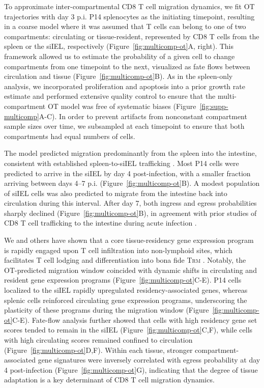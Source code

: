To approximate inter-compartmental CD8 T cell migration dynamics, we fit OT trajectories with day 3 p.i. P14 splenocytes as the initiating timepoint, resulting in a coarse model where it was assumed that T cells can belong to one of two compartments: circulating or tissue-resident, represented by CD8 T cells from the spleen or the siIEL, respectively (Figure~\ref{fig:multicomp-ot}A, right). This framework allowed us to estimate the probability of a given cell to change compartments from one timepoint to the next, visualized as fate flows between circulation and tissue (Figure~\ref{fig:multicomp-ot}B). As in the spleen-only analysis, we incorporated proliferation and apoptosis into a prior growth rate estimate and performed extensive quality control to ensure that the multi-compartment OT model was free of systematic biases (Figure~\ref{fig:supp-multicomp}A-C). In order to prevent artifacts from nonconstant compartment sample sizes over time, we subsampled at each timepoint to ensure that both compartments had equal numbers of cells.

The model predicted migration predominantly from the spleen into the intestine, consistent with established spleen-to-siIEL trafficking \citep{masopustDynamicCellMigration2010}. Most P14 cells were predicted to arrive in the siIEL by day 4 post-infection, with a smaller fraction arriving between days 4--7 p.i. (Figure~\ref{fig:multicomp-ot}B). A modest population of siIEL cells was also predicted to migrate from the intestine back into circulation during this interval. After day 7, both ingress and egress probabilities sharply declined (Figure~\ref{fig:multicomp-ot}B), in agreement with prior studies of CD8 T cell trafficking to the intestine during acute infection \citep{masopustDynamicCellMigration2010}.

We and others have shown that a core tissue-residency gene expression program is rapidly engaged upon T cell infiltration into non-lymphoid sites, which facilitates T cell lodging and differentiation into bona fide T\textsc{rm} \citep{milnerRunx3ProgramsCD82017, mackayHobitBlimp1Instruct2016}. Notably, the OT-predicted migration window coincided with dynamic shifts in circulating and resident gene expression programs (Figure~\ref{fig:multicomp-ot}C-E). P14 cells localized to the siIEL rapidly upregulated residency-associated genes, whereas splenic cells reinforced circulating gene expression programs, underscoring the plasticity of these programs during the migration window (Figure~\ref{fig:multicomp-ot}C-E). Fate-flow analysis further showed that cells with high residency gene set scores tended to remain in the siIEL (Figure~\ref{fig:multicomp-ot}C,F), while cells with high circulating scores remained confined to circulation (Figure~\ref{fig:multicomp-ot}D,F). Within each tissue, stronger compartment-associated gene signatures were inversely correlated with egress probability at day 4 post-infection (Figure~\ref{fig:multicomp-ot}G), indicating that the degree of tissue adaptation is a key determinant of CD8 T cell migration dynamics.

